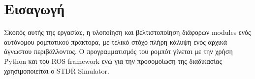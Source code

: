 \section*{Εισαγωγή}
Σκοπός αυτής της εργασίας, η υλοποίηση και βελτιστοποίηση διάφορων modules ενός αυτόνομου ρομποτικού πράκτορα, με τελικό στόχο πλήρη κάλυψη ενός αρχικά άγνωστου περιβάλλοντος. Ο προγραμματισμός του ρομπότ γίνεται με την χρήση Python και του ROS framework ενώ για την προσομοίωση της διαδικασίας χρησιμοποιείται ο STDR Simulator.

